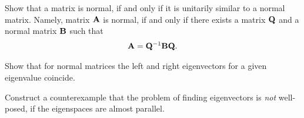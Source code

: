 
\begin{Sheet}

  \begin{Problem}
    Show that a matrix is normal, if and only if it is unitarily
    similar to a normal matrix. Namely, matrix $\mathbf A$ is normal, if
    and only if there exists a matrix $\mathbf Q$ and a normal matrix
    $\mathbf B$ such that
    \begin{gather*}
      \mathbf A = \mathbf Q^{-1} \mathbf B \mathbf Q.
    \end{gather*}
  \end{Problem}

  \begin{Problem}
    Show that for normal matrices the left and right eigenvectors for
    a given eigenvalue coincide.
  \end{Problem}

  \begin{Problem}
    Construct a counterexample that the problem of finding
    eigenvectors is \textit{not} well-posed, if the eigenspaces are
    almost parallel.
  \end{Problem}


\end{Sheet}

